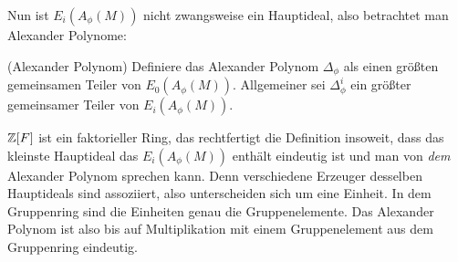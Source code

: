     	Nun ist $E_i(A_\phi(M))$ nicht zwangsweise ein Hauptideal, also betrachtet man Alexander Polynome:
    	\begin{defn}(Alexander Polynom)
    		Definiere das Alexander Polynom $\Delta_\phi$ als einen größten gemeinsamen Teiler von $E_0(A_\phi(M))$. Allgemeiner sei $\Delta_\phi^i$ ein größter gemeinsamer Teiler von $E_i(A_\phi(M))$.
    	\end{defn}
    	\begin{bem}
            $\mathbb{Z}[F]$ ist ein faktorieller Ring, das rechtfertigt die Definition insoweit, dass das kleinste Hauptideal das $E_i(A_\phi(M))$ enthält eindeutig ist und man von \emph{dem} Alexander Polynom sprechen kann. Denn verschiedene Erzeuger desselben Hauptideals sind assoziiert, also unterscheiden sich um eine Einheit. In dem Gruppenring sind die Einheiten genau die Gruppenelemente. Das Alexander Polynom ist also bis auf Multiplikation mit einem Gruppenelement aus dem Gruppenring eindeutig.
    	\end{bem}


